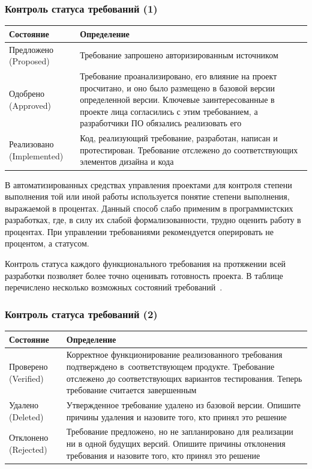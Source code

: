 \documentclass{../industrial-development}
\begin{document}
\begin{frame} \frametitle{Контроль статуса требований (1)}
\begin{tabular}{|p{}|p{}|}
	\hline \textbf{Состояние} & \textbf{Определение} \\
	\hline Предложено (Proposed) & Требование запрошено авторизированным источником\\
	\hline Одобрено (Approved) & Требование проанализировано, его влияние на проект просчитано, и оно было размещено в базовой версии определенной версии. Ключевые заинтересованные в проекте лица согласились с этим требованием, а разработчики ПО обязались реализовать его\\
	\hline Реализовано (Implemented) & Код, реализующий требование, разработан, написан и протестирован. Требование отслежено до соответствующих элементов дизайна и кода \\
	\hline 
\end{tabular}
\end{frame}

\lecturenotes

В автоматизированных средствах управления проектами для контроля степени выполнения той или иной работы используется понятие степени выполнения, выражаемой в процентах. Данный способ слабо применим в программистских разработках, где, в силу их слабой формализованности, трудно оценить работу в процентах. При управлении требованиями рекомендуется оперировать не процентом, а статусом. 

Контроль статуса каждого функционального требования на протяжении всей разработки позволяет более точно оценивать готовность проекта. В таблице перечислено несколько возможных состояний требований~\cite[с.~74]{Maglinec}.



\begin{frame} \frametitle{Контроль статуса требований (2)}
\begin{tabular}{|p{}|p{}|}
	\hline \textbf{Состояние} & \textbf{Определение} \\
	\hline Проверено (Verified) & Корректное функционирование реализованного требования подтверждено в~соответствующем продукте. Требование отслежено до соответствующих вариантов тестирования. Теперь требование считается завершенным\\
	\hline Удалено (Deleted) & Утвержденное требование удалено из базовой версии. Опишите причины удаления и назовите того, кто принял это решение\\
	\hline Отклонено (Rejected) & Требование предложено, но не запланировано для реализации ни в одной будущих версий. Опишите причины отклонения требования и назовите того, кто принял это решение\\
	\hline 
\end{tabular}
\end{frame}
\end{document}
